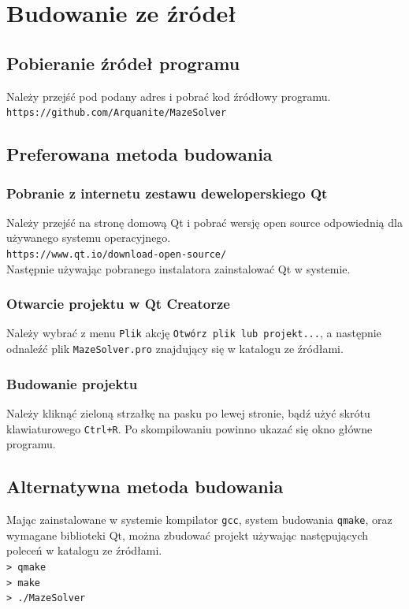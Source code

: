 \documentclass[12pt,a4paper]{article}
\begin{document}
	\section{Budowanie ze źródeł}

	\subsection{Pobieranie źródeł programu}
	Należy przejść pod podany adres i pobrać kod źródłowy programu.\\
	\texttt{https://github.com/Arquanite/MazeSolver}
	\subsection{Preferowana metoda budowania}

	\subsubsection{Pobranie z internetu zestawu deweloperskiego Qt}
	Należy przejść na stronę domową Qt i pobrać wersję open source odpowiednią
	dla używanego systemu operacyjnego.\\
	\texttt{https://www.qt.io/download-open-source/}\\
	Następnie używając pobranego instalatora zainstalować Qt w systemie.	

	\subsubsection{Otwarcie projektu w Qt Creatorze}
	Należy wybrać z menu \texttt{Plik} akcję \texttt{Otwórz plik lub projekt...},
	a następnie odnaleźć plik \texttt{MazeSolver.pro} znajdujący się w katalogu ze
	źródłami.
	
	\subsubsection{Budowanie projektu}
	Należy kliknąć zieloną strzałkę na pasku po lewej stronie, bądź użyć
	skrótu klawiaturowego \texttt{Ctrl+R}. Po skompilowaniu powinno ukazać
	się okno główne programu.

	\subsection{Alternatywna metoda budowania}
	
	Mając zainstalowane w systemie kompilator \texttt{gcc}, system budowania
	\texttt{qmake}, oraz wymagane biblioteki Qt, można zbudować projekt używając
	następujących poleceń w katalogu ze źródłami.\\
	\texttt{> qmake}\\
	\texttt{> make} \\
	\texttt{> ./MazeSolver} \\
	
\end{document}
